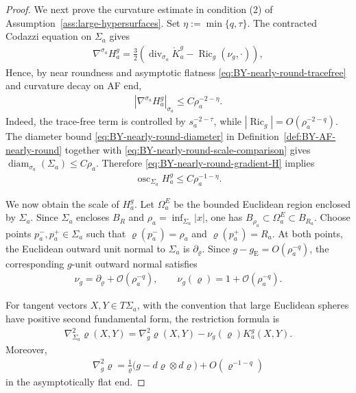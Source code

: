\documentclass[10pt,a4paper]{amsart}
\newcommand{\gE}{g_{\mathrm{E}}}
\newcommand{\Ric}{\operatorname{Ric}}
\begin{document}
\begin{proof}
		We next prove the curvature estimate in condition \textup{(2)} of Assumption~\ref{ass:large-hypersurfaces}. Set $\eta:=\min\{q,\tau\}$. The contracted Codazzi equation on $\Sigma_a$ gives
		\begin{align*}
			\nabla^{\sigma_a}H_a^g
			=
			\frac{3}{2}
			\left(
			\operatorname{div}_{\sigma_a}\mathring K_a^g
			-
			\Ric_g(\nu_g,\cdot)
			\right),
		\end{align*}
		Hence, by near roundness and asymptotic flatness \eqref{eq:BY-nearly-round-tracefree} and curvature decay on AF end,
		\begin{align}\label{eq:BY-nearly-round-gradient-H}
			\left|
			\nabla^{\sigma_a}H_a^g
			\right|_{\sigma_a}
			\leq
			C\rho_a^{-2-\eta}.
		\end{align}
		Indeed, the trace-free term is controlled by
		$s_a^{-2-\tau}$, while $|\Ric_g|=O(\rho_a^{-2-q})$. The diameter bound \eqref{eq:BY-nearly-round-diameter} in Definition~\ref{def:BY-AF-nearly-round}
		together with \eqref{eq:BY-nearly-round-scale-comparison} gives
		$\operatorname{diam}_{\sigma_a}(\Sigma_a)\leq C\rho_a$. Therefore
		\eqref{eq:BY-nearly-round-gradient-H} implies
		\begin{align}\label{eq:BY-nearly-round-H-oscillation}
			\operatorname{osc}_{\Sigma_a}H_a^g
			\leq
			C\rho_a^{-1-\eta}.
		\end{align}
		
		We now obtain the scale of $H_a^g$. Let $\Omega_a^E$ be the
		bounded Euclidean region enclosed by $\Sigma_a$. Since $\Sigma_a$
		encloses $B_R$ and $\rho_a=\inf_{\Sigma_a}|x|$, one has $B_{\rho_a}\subset\Omega_a^E\subset B_{R_a}$. Choose points $p_a^-,p_a^+\in\Sigma_a$ such that
		$\varrho(p_a^-)=\rho_a$ and $\varrho(p_a^+)=R_a$. At both points, the Euclidean outward unit normal to $\Sigma_a$ is
		$\partial_\varrho$. Since $g-\gE=O(\rho_a^{-q})$, the corresponding
		$g$-unit outward normal satisfies
		\begin{align*}
			\nu_g=\partial_\varrho+\mathcal O(\rho_a^{-q}),
			\qquad
			\nu_g(\varrho)=1+\mathcal O(\rho_a^{-q}).
		\end{align*}
		
		For tangent vectors $X,Y\in T\Sigma_a$, with the convention that
		large Euclidean spheres have positive second fundamental form, the restriction formula is
		\begin{align}\label{eq:BY-nearly-round-Hessian-restriction}
			\nabla_{\Sigma_a}^2\varrho(X,Y)
			= 
			\nabla_g^2\varrho(X,Y)
			-
			\nu_g(\varrho)K_a^g(X,Y).
		\end{align}
		Moreover,
		\begin{align}\label{eq:BY-nearly-round-radial-Hessian}
			\nabla_g^2\varrho
			=
			\frac1{\varrho}
			\bigl(g-d\varrho\otimes d\varrho\bigr)
			+
			O(\varrho^{-1-q})
		\end{align}
		in the asymptotically flat end.
		

\end{proof}
\end{document}

